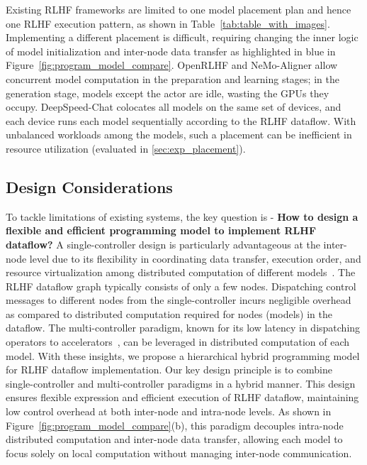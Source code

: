 Existing RLHF frameworks are limited to one model placement plan and hence one RLHF execution pattern, as shown in Table~\ref{tab:table_with_images}. Implementing a different placement is difficult, requiring changing the inner logic of 
{model initialization and inter-node data transfer as highlighted in blue in Figure~\ref{fig:program_model_compare}.}
OpenRLHF and NeMo-Aligner allow concurrent model computation in the preparation and learning stages; in the generation stage, models except the actor are idle, wasting the GPUs they occupy. 
DeepSpeed-Chat %
colocates all models on the same set of devices, 
and each device runs each model sequentially according to the RLHF dataflow. With unbalanced workloads among the models, such a placement can be inefficient in resource utilization
(evaluated in \textsection\ref{sec:exp_placement}).












\vspace{-2mm}
\subsection{Design Considerations}
To tackle limitations of existing systems,
the key question is -
\textbf{How to design a flexible and efficient programming model to implement RLHF dataflow?}
A single-controller design is particularly advantageous at the inter-node level due to its flexibility in coordinating data transfer, execution order, and resource virtualization among distributed computation of different models~\cite{barham2022pathways, moritz2018ray}. 
The RLHF dataflow graph  %
typically consists of only a few nodes. %
Dispatching control messages to different nodes from the single-controller %
incurs negligible overhead as compared to distributed computation required for nodes (models) in the dataflow.
The multi-controller paradigm, known for its low latency in dispatching operators to accelerators~\cite{darema2001spmd}, can be leveraged in distributed computation of each model.
With these insights, we propose a hierarchical hybrid programming model for RLHF dataflow implementation.
Our key design principle is to combine single-controller and multi-controller paradigms in a hybrid manner. %
This design ensures flexible expression and efficient execution of RLHF dataflow, maintaining low control overhead at both inter-node and intra-node levels.
As shown in Figure~\ref{fig:program_model_compare}(b), this paradigm decouples intra-node distributed computation and inter-node data transfer, allowing {each model}
to focus solely on local computation without managing inter-node communication. %



